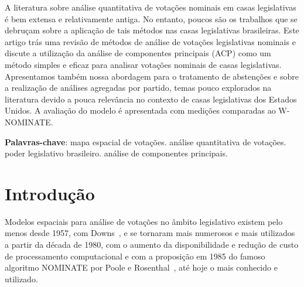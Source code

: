 \documentclass[
	article,			%
	12pt,				%
	oneside,			%
	a4paper,			%
	english,			%
	brazil,				%
	sumario=tradicional,
	oldfontcommands %
	]{abntex2}
\newcommand\wnominate{W-NOMINATE\xspace}
\begin{document}
 

\frenchspacing 

\maketitle 

\begin{resumoumacoluna}
A literatura sobre análise quantitativa de votações nominais em casas legislativas é bem extensa e relativamente antiga. No entanto, poucos são os trabalhos que se debruçam sobre a aplicação de tais métodos nas casas legislativas brasileiras. Este artigo trás uma revisão de métodos de análise de votações legislativas nominais e discute a utilização da análise de componentes principais (ACP) como um método simples e eficaz para analisar votações nominais de casas legislativas. Apresentamos também nossa abordagem para o tratamento de abstenções e sobre a realização de análises agregadas por partido, temas pouco explorados na literatura devido a pouca relevância no contexto de casas legislativas dos Estados Unidos. A avaliação do modelo é apresentada com medições comparadas ao \wnominate.

\vspace{\onelineskip}

\noindent
\textbf{Palavras-chave}: mapa espacial de votações. análise quantitativa de votações. poder legislativo brasileiro. análise de componentes principais.
\end{resumoumacoluna}

\textual

\section{Introdução}
\label{sec:intro}


Modelos espaciais para análise de votações no âmbito legislativo existem pelo menos desde 1957, com Downs~\cite{downs1957}, e se tornaram mais numerosos e mais utilizados a partir da década de 1980, com o aumento da disponibilidade e redução de custo de processamento computacional e com a proposição em 1985 do famoso algoritmo NOMINATE por Poole e Rosenthal~\cite{poole1985nominate}, até hoje o mais conhecido e utilizado. 
\end{document}
